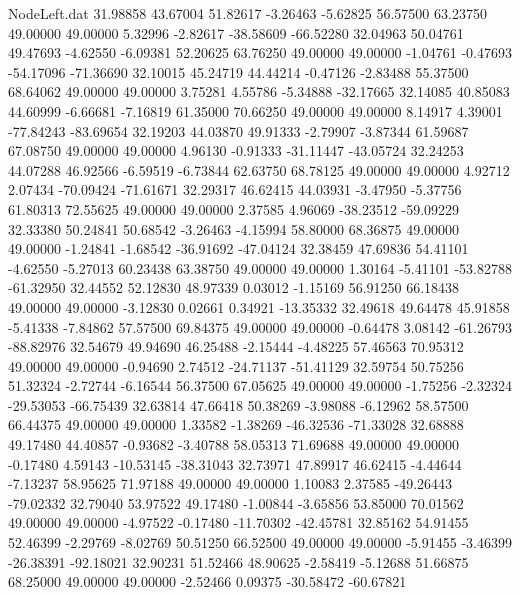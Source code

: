 \begin{filecontents}{NodeLeft.dat}
  31.98858   43.67004   51.82617    -3.26463   -5.62825   56.57500   63.23750   49.00000   49.00000    5.32996   -2.82617  -38.58609  -66.52280
  32.04963   50.04761   49.47693    -4.62550   -6.09381   52.20625   63.76250   49.00000   49.00000   -1.04761   -0.47693  -54.17096  -71.36690
  32.10015   45.24719   44.44214    -0.47126   -2.83488   55.37500   68.64062   49.00000   49.00000    3.75281    4.55786   -5.34888  -32.17665
  32.14085   40.85083   44.60999    -6.66681   -7.16819   61.35000   70.66250   49.00000   49.00000    8.14917    4.39001  -77.84243  -83.69654
  32.19203   44.03870   49.91333    -2.79907   -3.87344   61.59687   67.08750   49.00000   49.00000    4.96130   -0.91333  -31.11447  -43.05724
  32.24253   44.07288   46.92566    -6.59519   -6.73844   62.63750   68.78125   49.00000   49.00000    4.92712    2.07434  -70.09424  -71.61671
  32.29317   46.62415   44.03931    -3.47950   -5.37756   61.80313   72.55625   49.00000   49.00000    2.37585    4.96069  -38.23512  -59.09229
  32.33380   50.24841   50.68542    -3.26463   -4.15994   58.80000   68.36875   49.00000   49.00000   -1.24841   -1.68542  -36.91692  -47.04124
  32.38459   47.69836   54.41101    -4.62550   -5.27013   60.23438   63.38750   49.00000   49.00000    1.30164   -5.41101  -53.82788  -61.32950
  32.44552   52.12830   48.97339     0.03012   -1.15169   56.91250   66.18438   49.00000   49.00000   -3.12830    0.02661    0.34921  -13.35332
  32.49618   49.64478   45.91858    -5.41338   -7.84862   57.57500   69.84375   49.00000   49.00000   -0.64478    3.08142  -61.26793  -88.82976
  32.54679   49.94690   46.25488    -2.15444   -4.48225   57.46563   70.95312   49.00000   49.00000   -0.94690    2.74512  -24.71137  -51.41129
  32.59754   50.75256   51.32324    -2.72744   -6.16544   56.37500   67.05625   49.00000   49.00000   -1.75256   -2.32324  -29.53053  -66.75439
  32.63814   47.66418   50.38269    -3.98088   -6.12962   58.57500   66.44375   49.00000   49.00000    1.33582   -1.38269  -46.32536  -71.33028
  32.68888   49.17480   44.40857    -0.93682   -3.40788   58.05313   71.69688   49.00000   49.00000   -0.17480    4.59143  -10.53145  -38.31043
  32.73971   47.89917   46.62415    -4.44644   -7.13237   58.95625   71.97188   49.00000   49.00000    1.10083    2.37585  -49.26443  -79.02332
  32.79040   53.97522   49.17480    -1.00844   -3.65856   53.85000   70.01562   49.00000   49.00000   -4.97522   -0.17480  -11.70302  -42.45781
  32.85162   54.91455   52.46399    -2.29769   -8.02769   50.51250   66.52500   49.00000   49.00000   -5.91455   -3.46399  -26.38391  -92.18021
  32.90231   51.52466   48.90625    -2.58419   -5.12688   51.66875   68.25000   49.00000   49.00000   -2.52466    0.09375  -30.58472  -60.67821

\end{filecontents}
